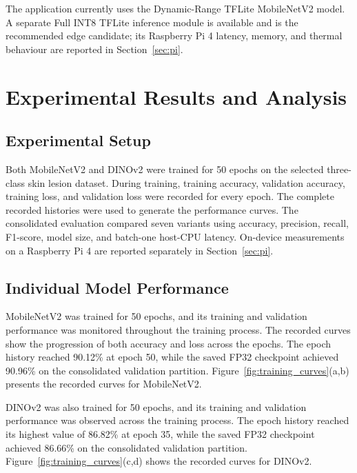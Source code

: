 \documentclass[3p,times,procedia]{elsarticle}
\begin{document}
The application currently uses the Dynamic-Range TFLite MobileNetV2 model. A separate Full INT8 TFLite inference module is available and is the recommended edge candidate; its Raspberry Pi 4 latency, memory, and thermal behaviour are reported in Section~\ref{sec:pi}.

\section{Experimental Results and Analysis}
\label{sec:results}

\subsection{Experimental Setup}
\label{sec:setup}

Both MobileNetV2 and DINOv2 were trained for 50 epochs on the selected three-class skin lesion dataset. During training, training accuracy, validation accuracy, training loss, and validation loss were recorded for every epoch. The complete recorded histories were used to generate the performance curves. The consolidated evaluation compared seven variants using accuracy, precision, recall, F1-score, model size, and batch-one host-CPU latency. On-device measurements on a Raspberry Pi 4 are reported separately in Section~\ref{sec:pi}.

\subsection{Individual Model Performance}
\label{sec:individual}

MobileNetV2 was trained for 50 epochs, and its training and validation performance was monitored throughout the training process. The recorded curves show the progression of both accuracy and loss across the epochs. The epoch history reached 90.12\% at epoch 50, while the saved FP32 checkpoint achieved 90.96\% on the consolidated validation partition. Figure~\ref{fig:training_curves}(a,b) presents the recorded curves for MobileNetV2.

DINOv2 was also trained for 50 epochs, and its training and validation performance was observed across the training process. The epoch history reached its highest value of 86.82\% at epoch 35, while the saved FP32 checkpoint achieved 86.66\% on the consolidated validation partition. Figure~\ref{fig:training_curves}(c,d) shows the recorded curves for DINOv2.
\end{document}
